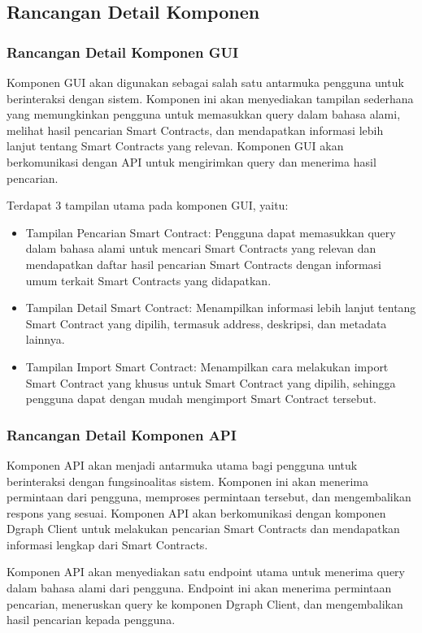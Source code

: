 \subsection{Rancangan Detail Komponen}

\subsubsection{Rancangan Detail Komponen GUI}

Komponen GUI akan digunakan sebagai salah satu antarmuka pengguna untuk berinteraksi dengan sistem. Komponen ini akan menyediakan tampilan sederhana yang memungkinkan pengguna untuk memasukkan query dalam bahasa alami, melihat hasil pencarian Smart Contracts, dan mendapatkan informasi lebih lanjut tentang Smart Contracts yang relevan. Komponen GUI akan berkomunikasi dengan API untuk mengirimkan query dan menerima hasil pencarian.

Terdapat 3 tampilan utama pada komponen GUI, yaitu:
\begin{itemize}
	\item Tampilan Pencarian Smart Contract: Pengguna dapat memasukkan query dalam bahasa alami untuk mencari Smart Contracts yang relevan dan mendapatkan daftar hasil pencarian Smart Contracts dengan informasi umum terkait Smart Contracts yang didapatkan.
	\item Tampilan Detail Smart Contract: Menampilkan informasi lebih lanjut tentang Smart Contract yang dipilih, termasuk address, deskripsi, dan metadata lainnya.
	\item Tampilan Import Smart Contract: Menampilkan cara melakukan import Smart Contract yang khusus untuk Smart Contract yang dipilih, sehingga pengguna dapat dengan mudah mengimport Smart Contract tersebut.
\end{itemize}

\subsubsection{Rancangan Detail Komponen API}

Komponen API akan menjadi antarmuka utama bagi pengguna untuk berinteraksi dengan fungsinoalitas sistem. Komponen ini akan menerima permintaan dari pengguna, memproses permintaan tersebut, dan mengembalikan respons yang sesuai. Komponen API akan berkomunikasi dengan komponen Dgraph Client untuk melakukan pencarian Smart Contracts dan mendapatkan informasi lengkap dari Smart Contracts.

Komponen API akan menyediakan satu endpoint utama untuk menerima query dalam bahasa alami dari pengguna. Endpoint ini akan menerima permintaan pencarian, meneruskan query ke komponen Dgraph Client, dan mengembalikan hasil pencarian kepada pengguna.

